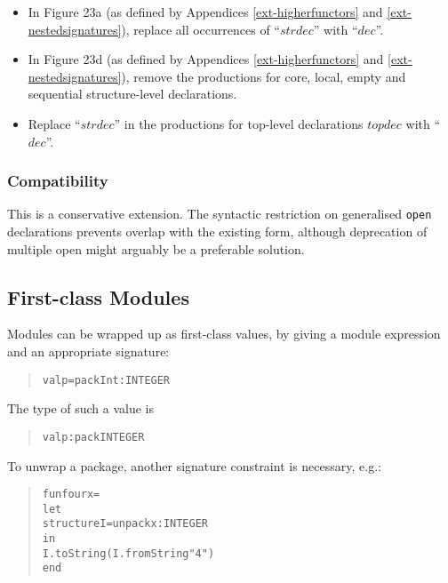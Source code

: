 \documentclass[twoside,titlepage]{article}
\begin{document}
\begin{appendix}
\begin{itemize}
\item In Figure 23a (as defined by Appendices \ref{ext-higherfunctors} and \ref{ext-nestedsignatures}), replace all occurrences of ``$\mathit{strdec}$'' with ``$\mathit{dec}$''.

\item In Figure 23d (as defined by Appendices \ref{ext-higherfunctors} and \ref{ext-nestedsignatures}), remove the productions for core, local, empty and sequential structure-level declarations.

\item Replace ``$\mathit{strdec}$'' in the productions for top-level declarations $\mathit{topdec}$ with ``$\mathit{dec}$''.
\end{itemize}

\subsubsection*{Compatibility}

This is a conservative extension. The syntactic restriction on generalised {\tt open} declarations prevents overlap with the existing form, although deprecation of multiple open might arguably be a preferable solution.


\subsection{First-class Modules}
\label{ext-firstclass}

Modules can be wrapped up as first-class values, by giving a module expression and an appropriate signature:
\begin{quote}
\begin{alltt}
val p = pack Int : INTEGER
\end{alltt}
\end{quote}
The type of such a value is
\begin{quote}
\begin{alltt}
val p : pack INTEGER
\end{alltt}
\end{quote}
To unwrap a package, another signature constraint is necessary, e.g.:
\begin{quote}
\begin{alltt}
fun four x =
    let
        structure I = unpack x : INTEGER
    in
        I.toString(I.fromString "4")
    end
\end{alltt}
\end{quote}


\end{appendix}
\end{document}
